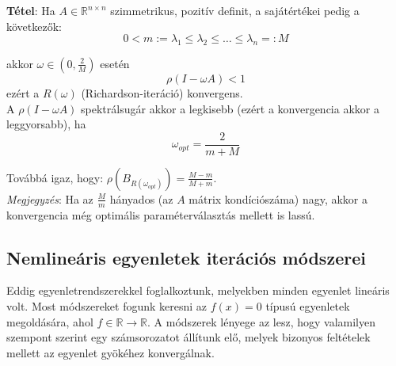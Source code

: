 \documentclass[tikz,12pt,margin=0px]{article}
\newcommand\ddfrac[2]{\frac{\displaystyle #1}{\displaystyle #2}}
\begin{document}
	\noindent \textbf{Tétel}: Ha $A \in \mathbb{R}^{n \times n}$ szimmetrikus, pozitív definit, a sajátértékei pedig a következők:
	\begin{displaymath}
		0 < m := \lambda_{1} \leq \lambda_{2} \leq \ldots \leq \lambda_{n} =: M
	\end{displaymath}
	
	\noindent akkor $\omega \in (0,\ddfrac{2}{M})$ esetén
    \[
        \rho(I - \omega A) < 1
    \]
    ezért a $R(\omega)$ (Richardson-iteráció) konvergens.\\

    \noindent A $\rho(I - \omega A)$ spektrálsugár akkor a legkisebb (ezért a konvergencia akkor a leggyorsabb), ha
    \[
        \omega_{opt} = \ddfrac{2}{m + M}
    \]

	\noindent Továbbá igaz, hogy: $\rho(B_{R(\omega_{opt})}) = \ddfrac{M - m}{M + m}$.\\

    \noindent \emph{Megjegyzés}: Ha az $\ddfrac{M}{m}$ hányados (az $A$ mátrix kondíciószáma) nagy, akkor a konvergencia még optimális paraméterválasztás mellett is lassú.

	\subsection*{Nemlineáris egyenletek iterációs módszerei}
	
	Eddig egyenletrendszerekkel foglalkoztunk, melyekben minden egyenlet lineáris volt. Most módszereket
	fogunk keresni az $f(x) = 0$ típusú egyenletek megoldására, ahol $f \in \mathbb{R} \to \mathbb{R}$. A módszerek
	lényege az lesz, hogy valamilyen szempont szerint egy számsorozatot állítunk elő, melyek bizonyos
	feltételek mellett az egyenlet gyökéhez konvergálnak.\\
\end{document}
